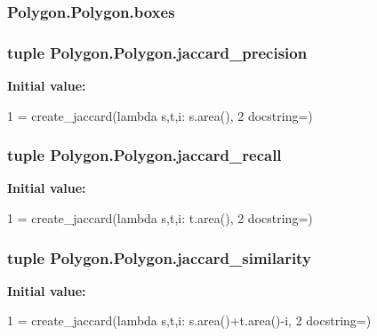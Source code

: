 \subsubsection[{boxes}]{\setlength{\rightskip}{0pt plus 5cm}Polygon.\+Polygon.\+boxes}\label{class_polygon_1_1_polygon_ad22b50b73d0b02bb4cb4078181ad972b}
\hypertarget{class_polygon_1_1_polygon_a7cd26b002991947f70114fc4f8da73c9}{}
\subsubsection[{jaccard\+\_\+precision}]{\setlength{\rightskip}{0pt plus 5cm}tuple Polygon.\+Polygon.\+jaccard\+\_\+precision\hspace{0.3cm}{\ttfamily [static]}}\label{class_polygon_1_1_polygon_a7cd26b002991947f70114fc4f8da73c9}
{\bfseries Initial value\+:}
\begin{DoxyCode}
1 = create\_jaccard(\textcolor{keyword}{lambda} s,t,i: s.area(),
2        docstring=)
\end{DoxyCode}
\hypertarget{class_polygon_1_1_polygon_a342d96bb5b04f0d8c39bf6b7ff5c890b}{}
\subsubsection[{jaccard\+\_\+recall}]{\setlength{\rightskip}{0pt plus 5cm}tuple Polygon.\+Polygon.\+jaccard\+\_\+recall\hspace{0.3cm}{\ttfamily [static]}}\label{class_polygon_1_1_polygon_a342d96bb5b04f0d8c39bf6b7ff5c890b}
{\bfseries Initial value\+:}
\begin{DoxyCode}
1 = create\_jaccard(\textcolor{keyword}{lambda} s,t,i: t.area(),
2        docstring=)
\end{DoxyCode}
\hypertarget{class_polygon_1_1_polygon_aa500070e727a20fec33301308be80778}{}
\subsubsection[{jaccard\+\_\+similarity}]{\setlength{\rightskip}{0pt plus 5cm}tuple Polygon.\+Polygon.\+jaccard\+\_\+similarity\hspace{0.3cm}{\ttfamily [static]}}\label{class_polygon_1_1_polygon_aa500070e727a20fec33301308be80778}
{\bfseries Initial value\+:}
\begin{DoxyCode}
1 = create\_jaccard(\textcolor{keyword}{lambda} s,t,i: s.area()+t.area()-i,
2        docstring=)
\end{DoxyCode}
\hypertarget{class_polygon_1_1_polygon_a23c2f3cec7fb964a87c1dae19dbb8180}{}
